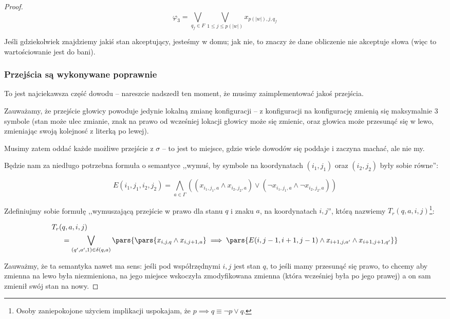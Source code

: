 \begin{proof}
	\[
		\varphi_3 = \bigvee_{q_f \in F } \bigvee_{1 \leq j \leq p(|w|)} x_{p(|w|), j, q_f}
	\]

	Jeśli gdziekolwiek znajdziemy jakiś stan akceptujący, jesteśmy w domu; jak nie, to znaczy że dane obliczenie nie akceptuje słowa (więc to wartościowanie jest do bani).

	\subsubsection{Przejścia są wykonywane poprawnie}
	To jest najciekawsza część dowodu -- nareszcie nadszedł ten moment, że musimy zaimplementować jakoś przejścia.

	Zauważamy, że przejście głowicy powoduje jedynie lokalną zmianę konfiguracji -- z konfiguracji na konfigurację zmienią się maksymalnie 3 symbole (stan może ulec zmianie, znak na prawo od wcześniej lokacji głowicy może się zmienic, oraz głowica może przesunąć się w lewo, zmieniając swoją kolejnosć z literką po lewej).

	Musimy zatem oddać każde możliwe przejście z \( \sigma \) -- to jest to miejsce, gdzie wiele dowodów się poddaje i zaczyna machać, ale nie my.

	Będzie nam za niedługo potrzebna formuła o semantyce ,,wymuś, by symbole na koordynatach \( (i_1, j_1) \) oraz \((i_2, j_2)\) były sobie równe'':

	\[
		E(i_1, j_1, i_2, j_2) = \bigwedge_{a \in \Gamma} ((x_{i_1, j_1, a} \land x_{i_2, j_2, a}) \lor (\neg x_{i_1, j_1, a} \land \neg x_{i_2, j_2, a}) )
	\]

	Zdefiniujmy sobie formułę ,,wymuszającą przejście w prawo dla stanu \(q\) i znaku \(a\), na koordynatach \(i, j\)'', którą nazwiemy \(T_r(q, a, i, j)\)\footnote{Osoby zaniepokojone użyciem implikacji uspokajam, że \(p \implies q \equiv \neg p \lor q\).}:

	\[
		\begin{split}
			T_r( & q,a, i, j)                                                                                                                                                            \\
			     & = \bigvee_{(q', a', 1) \in \delta(q,a)} \pars{\pars{x_{i,j,q} \land x_{i, j + 1, a}} \implies \pars{E(i, j-1, i+1, j-1) \land x_{i+1, j, a'} \land x_{i+1, j+1, q'}}}
		\end{split}
	\]

	Zauważmy, że ta semantyka nawet ma sens: jeśli pod współrzędnymi \(i,j\) jest stan \(q\), to jeśli mamy przesunąć się prawo, to chcemy aby zmienna na lewo była niezmieniona, na jego miejsce wskoczyła zmodyfikowana zmienna (która wcześniej była po jego prawej) a on sam zmienił swój stan na nowy.


\end{proof}
